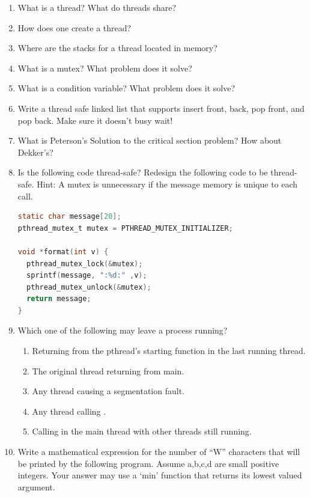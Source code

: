 \begin{enumerate}
\item What is a thread? What do threads share?
\item How does one create a thread?
\item Where are the stacks for a thread located in memory?
\item What is a mutex? What problem does it solve?
\item What is a condition variable? What problem does it solve?
\item Write a thread safe linked list that supports insert front, back, pop front, and pop back. Make sure it doesn't busy wait!
\item What is Peterson's Solution to the critical section problem? How about Dekker's?
\item Is the following code thread-safe? Redesign the following code to be thread-safe. Hint: A mutex is unnecessary if the message memory is unique to each call.

\begin{lstlisting}[language=C]
static char message[20];
pthread_mutex_t mutex = PTHREAD_MUTEX_INITIALIZER;

void *format(int v) {
  pthread_mutex_lock(&mutex);
  sprintf(message, ":%d:" ,v);
  pthread_mutex_unlock(&mutex);
  return message;
}
\end{lstlisting}

\item Which one of the following may leave a process running?

\begin{enumerate}
\item Returning from the pthread's starting function in the last running thread.
\item The original thread returning from main.
\item Any thread causing a segmentation fault.
\item Any thread calling .
\item Calling  in the main thread with other threads still running.
\end{enumerate}

\item Write a mathematical expression for the number of ``W'' characters that will be printed by the following program. Assume a,b,c,d are small positive integers. Your answer may use a `min' function that returns its lowest valued argument.


\end{enumerate}
